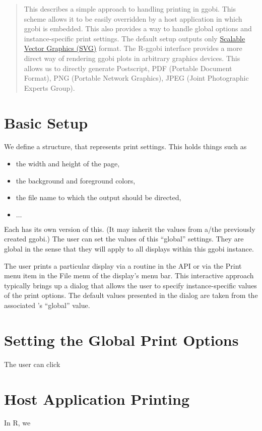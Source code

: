 \documentclass{article}
\begin{document}
\begin{abstract}

  This describes a simple approach to handling printing in ggobi. This
  scheme allows it to be easily overridden by a host application in
  which ggobi is embedded.  This also provides a way to handle global
  options and instance-specific print settings.
  The default setup outputs only \href{http://www.w3.org/Graphics/SVG}{Scalable Vector Graphics (SVG)}
  format. The R-ggobi interface provides a more direct way of
  rendering ggobi plots in arbitrary graphics devices. This allows us
  to directly generate Postscript, PDF (Portable Document Format),
  PNG (Portable Network Graphics),  JPEG (Joint Photographic Experts Group).
\end{abstract}

\section{Basic Setup}

We define a structure,  that represents print
settings.
This holds things such as 
\begin{itemize}
\item the width and height of the page,
\item the background and foreground colors,
\item the file name to which the output
should be directed,
\item $\ldots$
\end{itemize}

Each  has its own version of this.  (It may inherit
the values from a/the previously created ggobi.)  The user can set the
values of this ``global'' settings. They are global in the sense that
they will apply to all displays within this ggobi instance.

The user prints a particular display via a routine in the API or via
the Print menu item in the File menu of the display's menu bar.  This
interactive approach typically brings up a dialog that allows the user
to specify instance-specific values of the print options. The default
values presented in the dialog are taken from the associated
's ``global'' value.


\section{Setting the Global Print Options}
The user can click 

\section{Host Application Printing}
In R, we 
\end{document}
